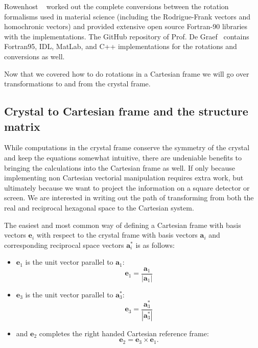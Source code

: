 Rowenhost \etal~\cite{Rowenhorst15} worked out the complete conversions between the rotation formalisms used in material science (including the Rodrigue-Frank vectors and homochronic vectors) and provided extensive open source Fortran-90 libraries with the implementations. The GitHub repository of Prof. De Graef~\cite{3Drot} contains Fortran95, IDL, MatLab, and C++ implementations for the rotations and conversions as well.


Now that we covered how to do rotations in a Cartesian frame we will go over transformations to and from the crystal frame.


\subsection{Crystal to Cartesian frame and the structure matrix}

While computations in the crystal frame conserve the symmetry of the crystal and keep the equations somewhat intuitive, there are undeniable benefits to bringing the calculations into the Cartesian frame as well. If only because implementing non Cartesian vectorial manipulation requires extra work, but ultimately because we want to project the information on a square detector or screen. We are interested in writing out the path of transforming from both the real and reciprocal hexagonal space to the Cartesian system. 

The easiest and most common way of defining a Cartesian frame with basis vectors $\mathbf{e}_i$ with respect to the crystal frame with basis vectors $\mathbf{a}_i$ and corresponding reciprocal space vectors  $\mathbf{a}^*_i$ is as follows:
\begin{itemize}
\item  $\mathbf{e}_1$ is the unit vector parallel to $\mathbf{a}_1$:
\begin{equation}
\label{eq:e1}
\mathbf{e}_1 =\frac{\mathbf{a}_1 }{|\mathbf{a}_1| } 
\end{equation}

\item  $\mathbf{e}_3$ is the unit vector parallel to $\mathbf{a}^*_3$: 
\begin{equation}
\mathbf{e}_3 =\frac{\mathbf{a}^*_3 }{|\mathbf{a}^*_3| } 
\end{equation}

\item and $\mathbf{e}_2$ completes the right handed Cartesian reference frame:
\begin{equation}
\label{eq:e3}
\mathbf{e}_2 = \mathbf{e}_3 \times \mathbf{e}_1 .
\end{equation}
\end{itemize}

